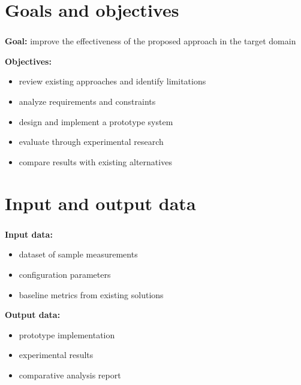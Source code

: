 
\frame[plain]{\titlepage} %


\section{Goals and objectives}

\begin{frame}
  \frametitle{\insertsection}

  \textbf{Goal:} improve the effectiveness of the proposed approach in the target domain

  \vspace{\baselineskip}

  \textbf{Objectives:}
  \begin{itemize}
    \item review existing approaches and identify limitations
    \item analyze requirements and constraints
    \item design and implement a prototype system
    \item evaluate through experimental research
    \item compare results with existing alternatives
  \end{itemize}
\end{frame}


\section{Input and output data}

\begin{frame}
  \frametitle{\insertsection}

  \textbf{Input data:}
  \begin{itemize}
    \item dataset of sample measurements
    \item configuration parameters
    \item baseline metrics from existing solutions
  \end{itemize}

  \vspace{\baselineskip}

  \textbf{Output data:}
  \begin{itemize}
    \item prototype implementation
    \item experimental results
    \item comparative analysis report
  \end{itemize}
\end{frame}

